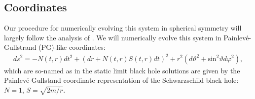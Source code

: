 \documentclass[a4paper,11pt]{article}
\begin{document}
\subsection{Coordinates}
   Our procedure for numerically evolving this system in spherical symmetry
will largely follow the analysis of \cite{Ripley:2020vpk}.
   We will numerically evolve this system in Painlev\'{e}-Gullstrand (PG)-like
coordinates:
\begin{align}
   ds^2
   =
-  N(t,r)dt^2
+  \left(dr+N(t,r)S(t,r)dt\right)^2
+  r^2\left(d\vartheta^2+\mathrm{sin}^2\vartheta d\varphi^2\right)
   ,
\end{align}
   which are so-named as in the static limit black hole solutions are given
by the Painlev\'{e}-Gullstand coordinate representation of the Schwarzschild
black hole: $N=1$, $S=\sqrt{2m/r}$.
\end{document}
